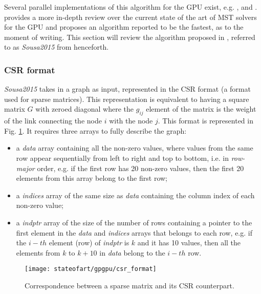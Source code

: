 Several parallel implementations of this algorithm for the GPU exist, e.g. \citep{Vineet2009}, \cite{harish2009large} and \citep{Sousa2015}. \citet{Sousa2015} provides a more in-depth review over the current state of the art of MST solvers for the GPU and proposes an algorithm reported to be the fastest, as to the moment of writing.
This section will review the algorithm proposed in \citep{Sousa2015}, referred to as \emph{Sousa2015} from henceforth.

\subsubsection{CSR format}
\emph{Sousa2015} takes in a graph as input, represented in the CSR format (a format used for sparse matrices).
This representation is equivalent to having a square matrix $G$ with zeroed diagonal where the $g_{ij}$ element of the matrix is the weight of the link connecting the node $i$ with the node $j$.
This format is represented in Fig. \ref{fig:csr}.
It requires three arrays to fully describe the graph:

\begin{itemize}
	\item a \emph{data} array containing all the non-zero values, where values from the same row appear sequentially from left to right and top to bottom, i.e. in \emph{row-major} order, e.g. if the first row has 20 non-zero values, then the first 20 elements from this array belong to the first row;
	\item a \emph{indices} array of the same size as \emph{data} containing the column index of each non-zero value;
	\item a \emph{indptr} array of the size of the number of rows containing a pointer to the first element in the \emph{data} and \emph{indices} arrays that belongs to each row, e.g. if the $i-th$ element (row) of \emph{indptr} is $k$ and it has 10 values, then all the elements from $k$ to $k + 10$ in \emph{data} belong to the $i-th$ row.
\end{itemize}

\begin{figure}[hbtp]
\centering
\texttt{[image: stateofart/gpgpu/csr\_format]}
\caption{Correspondence between a sparse matrix and its CSR counterpart.}
\label{fig:csr}
\end{figure}

